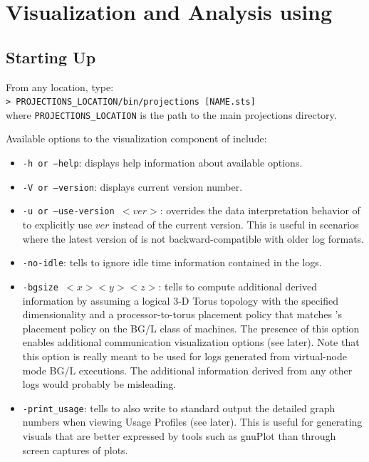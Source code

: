\documentclass[10pt]{report}
\begin{document}
\section{Visualization and Analysis using \projections{}}

\subsection{Starting Up}
\label{sec:startingUp}
From any location, type: \\
{\tt > PROJECTIONS\_LOCATION/bin/projections [NAME.sts]} \\
where {\tt PROJECTIONS\_LOCATION} is the path to the main projections
directory.

Available options to the visualization component of \projections{} include:

\begin{itemize}
\item
{\tt -h or --help}: displays help information about available options.
\item
{\tt -V or --version}: displays current \projections{} version number.
\item
{\tt -u or --use-version $<ver>$}: overrides the data interpretation
behavior of \projections{} to explicitly use $ver$ instead of the
current version. This is useful in scenarios where the latest version
of \projections{} is not backward-compatible with older log formats.
\item
{\tt -no-idle}: tells \projections{} to ignore idle time information
contained in the logs.
\item
{\tt -bgsize $<x> <y> <z>$}: tells \projections{} to compute
additional derived information by assuming a logical 3-D Torus
topology with the specified dimensionality and a processor-to-torus
placement policy that matches \charmpp's placement policy on the BG/L
class of machines. The presence of this option enables additional
communication visualization options (see later). Note that this option
is really meant to be used for logs generated from virtual-node mode
BG/L executions. The additional information derived from any other
logs would probably be misleading.
\item
{\tt -print\_usage}: tells \projections{} to also write to standard
output the detailed graph numbers when viewing Usage Profiles (see
later). This is useful for generating visuals that are better
expressed by tools such as gnuPlot than through screen captures of
\projections{} plots.
\end{itemize}
\end{document}
